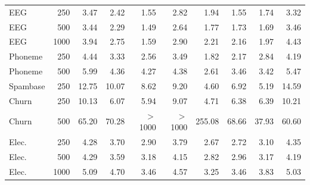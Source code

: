 \documentclass[pdflatex,sn-mathphys-num,iicol]{sn-jnl}
\theoremstyle{thmstyleone}
\theoremstyle{thmstyletwo}
\theoremstyle{thmstylethree}
\begin{document}
\begin{table}[t]
\begin{tabular}{lrrrrrrrrr}
EEG & 250 & 3.47 & 2.42 & 1.55 & 2.82 & 1.94 & 1.55 & 1.74 & 3.32 \\
EEG & 500 & 3.44 & 2.29 & 1.49 & 2.64 & 1.77 & 1.73 & 1.69 & 3.46 \\
EEG & 1000 & 3.94 & 2.75 & 1.59 & 2.90 & 2.21 & 2.16 & 1.97 & 4.43 \\
Phoneme & 250 & 4.44 & 3.33 & 2.56 & 3.49 & 1.82 & 2.17 & 2.84 & 4.19 \\
Phoneme & 500 & 5.99 & 4.36 & 4.27 & 4.38 & 2.61 & 3.46 & 3.42 & 5.47 \\
Spambase & 250 & 12.75 & 10.07 & 8.62 & 9.20 & 4.60 & 6.92 & 5.19 & 14.59 \\
Churn & 250 & 10.13 & 6.07 & 5.94 & 9.07 & 4.71 & 6.38 & 6.39 & 10.21 \\
Churn & 500 & 65.20 & 70.28 & $>$1000 & $>$1000 & 255.08 & 68.66 & 37.93 & 60.60 \\
Elec. & 250 & 4.28 & 3.70 & 2.90 & 3.79 & 2.67 & 2.72 & 3.10 & 4.35 \\
Elec. & 500 & 4.29 & 3.59 & 3.18 & 4.15 & 2.82 & 2.96 & 3.17 & 4.19 \\
Elec. & 1000 & 5.09 & 4.70 & 3.46 & 4.57 & 3.25 & 3.46 & 3.83 & 5.03 \\
\bottomrule
\end{tabular}

\end{table}
\end{document}
